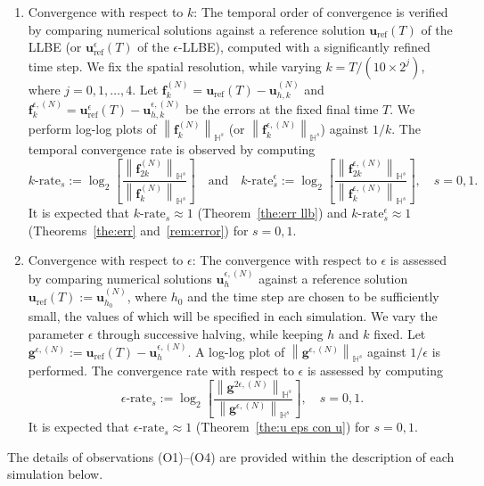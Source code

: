 \documentclass[11pt,reqno]{amsart}
\theoremstyle{definition}
\numberwithin{equation}{section}
\newcommand{\bff}{\boldsymbol}
\newcommand{\bb}{\mathbb}
\newcommand{\norm}[2]{\left\|{#1}\right\|_{#2}}
\begin{document}
{\begin{enumerate}
\item[(O3)] Convergence with respect to $k$:
The temporal order of convergence is verified by comparing numerical solutions against a reference solution $\bff{u}_\mathrm{ref}(T)$ of the LLBE (or $\bff{u}^\epsilon_\mathrm{ref}(T)$ of the $\epsilon$-LLBE), computed with a significantly refined time step. We fix the spatial resolution, while varying $k=T/(10\times 2^j)$, where $j=0,1,\ldots,4$. Let $\bff{f}_k^{(N)}= \bff{u}_\mathrm{ref}(T)- \bff{u}_{h,k}^{(N)}$ and $\bff{f}_k^{\epsilon, (N)}= \bff{u}_\mathrm{ref}^\epsilon(T)- \bff{u}_{h,k}^{\epsilon, (N)}$ be the errors at the fixed final time $T$. We perform log-log plots of $\norm{\bff{f}_k^{(N)}}{\bb{H}^s}$ (or $\norm{\bff{f}_k^{\epsilon, (N)}}{\bb{H}^s}$) against $1/k$. The temporal convergence rate is observed by computing
\begin{equation}\label{equ:krate}
    k\text{-rate}_s:= \log_2 \left[\frac{\norm{\bff{f}_{2k}^{(N)}}{\bb{H}^s}}{\norm{\bff{f}_k^{(N)}}{\bb{H}^s}} \right]
    \quad \text{and} \quad
    k\text{-rate}^\epsilon_s:= \log_2 \left[\frac{\norm{\bff{f}_{2k}^{\epsilon,(N)}}{\bb{H}^s}}{\norm{\bff{f}_k^{\epsilon,(N)}}{\bb{H}^s}} \right],
    \quad
    s=0,1.
\end{equation}
It is expected that $k\text{-rate}_s\approx 1$ (Theorem~\ref{the:err llb}) and $k\text{-rate}^\epsilon_s\approx 1$ (Theorems~\ref{the:err} and~\ref{rem:error}) for $s=0,1$.

\item[(O4)] Convergence with respect to $\epsilon$: The convergence with respect to $\epsilon$ is assessed by comparing numerical solutions $\bff{u}_h^{\epsilon, (N)}$ against a reference solution $\bff{u}_\mathrm{ref}(T):= \bff{u}_{h_0}^{(N)}$, where $h_0$ and the time step are chosen to be sufficiently small, the values of which will be specified in each simulation. We vary the parameter $\epsilon$ through successive halving, while keeping $h$ and $k$ fixed. Let $\bff{g}^{\epsilon, (N)}:= \bff{u}_\mathrm{ref}(T)- \bff{u}_h^{\epsilon, (N)}$. A log-log plot of $\norm{\bff{g}^{\epsilon, (N)}}{\bb{H}^s}$ against $1/\epsilon$ is performed. The convergence rate with respect to $\epsilon$ is assessed by computing
\begin{equation}\label{equ:epsrate}
    \epsilon\text{-rate}_s:= \log_2 \left[\frac{\norm{\bff{g}^{2\epsilon, (N)}}{\bb{H}^s}}{\norm{\bff{g}^{\epsilon, (N)}}{\bb{H}^s}} \right],
    \quad
    s=0,1.
\end{equation}
It is expected that $\epsilon\text{-rate}_s\approx 1$ (Theorem~\ref{the:u eps con u}) for $s=0,1$.
\end{enumerate}

The details of observations (O1)--(O4) are provided within the description of each simulation below.
}
\end{document}
